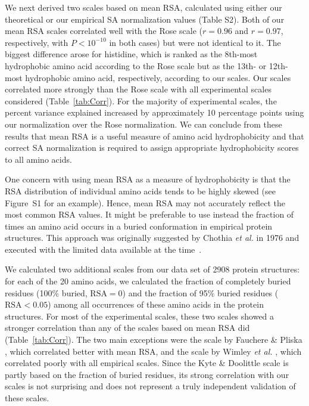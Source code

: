 \documentclass[11pt]{article}
\begin{document}
We next derived two scales based on mean RSA, calculated using either our theoretical or our empirical SA normalization values (Table S2). Both of our mean RSA scales correlated well with the Rose scale ($r=0.96$ and $r=0.97$, respectively, with $P<10^{-10}$ in both cases) but were not identical to it. The biggest difference arose for histidine, which is ranked as the 8th-most hydrophobic amino acid according to the Rose scale but as the 13th- or 12th-most hydrophobic amino acid, respectively, according to our scales. Our scales correlated more strongly than the Rose scale with all experimental scales considered (Table~\ref{tab:Corr}). For the majority of experimental scales, the percent variance explained increased by approximately 10 percentage points using our normalization over the Rose normalization. We can conclude from these results that mean RSA is a useful measure of amino acid hydrophobicity and that correct SA normalization is required to assign appropriate hydrophobicity scores to all amino acids.

One concern with using mean RSA as a measure of hydrophobicity is that the RSA distribution of individual amino acids tends to be highly skewed (see Figure~S1 for an example). Hence, mean RSA may not accurately reflect the most common RSA values. It might be preferable to use instead the fraction of times an amino acid occurs in a buried conformation in empirical protein structures. This approach was originally suggested by Chothia \emph{et al.} in 1976 and executed with the limited data available at the time~\cite{Chothia1976}.

We calculated two additional scales from our data set of 2908 protein structures: for each of the 20 amino acids, we calculated the fraction of completely buried residues (100\% buried, $\text{RSA}=0$) and the fraction of 95\% buried residues ($\text{RSA}<0.05$) among all occurrences of these amino acids in the protein structures. For most of the experimental scales, these two scales showed a stronger correlation than any of the scales based on mean RSA did (Table~\ref{tab:Corr}). The two main exceptions were the scale by Fauchere \& Pliska \cite{Fauchere1983}, which correlated better with mean RSA, and the scale by Wimley \emph{et al.} \cite{Wimley1996}, which correlated poorly with all empirical scales. Since the Kyte \& Doolittle scale \cite{Kyte1981} is partly based on the fraction of buried residues, its strong correlation with our scales is not surprising and does not represent a truly independent validation of these scales.
\end{document}
